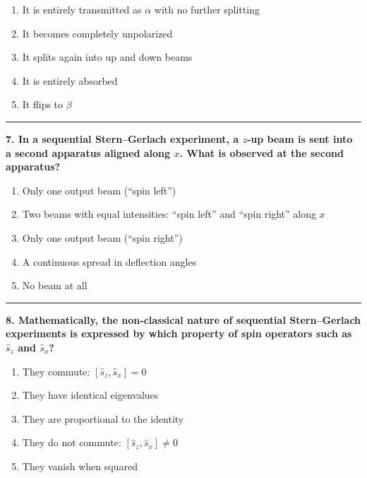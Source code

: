 \documentclass[
  english,
  9pt,
]{extbook}
\providecommand{\tightlist}{%
  \setlength{\itemsep}{0pt}\setlength{\parskip}{0pt}}
\theoremstyle{definition}
\theoremstyle{definition}
\theoremstyle{definition}
\theoremstyle{definition}
\theoremstyle{remark}
\begin{document}
\begin{enumerate}
\def\labelenumi{\alph{enumi}.}
\tightlist
\item
  It is entirely transmitted as \(\alpha\) with no further splitting\\
\item
  It becomes completely unpolarized\\
\item
  It splits again into up and down beams\\
\item
  It is entirely absorbed\\
\item
  It flips to \(\beta\)
\end{enumerate}

\begin{center}\rule{0.5\linewidth}{0.5pt}\end{center}

\textbf{7. In a sequential Stern--Gerlach experiment, a \(z\)-up beam is sent into a second apparatus aligned along \(x\). What is observed at the second apparatus?}

\begin{enumerate}
\def\labelenumi{\alph{enumi}.}
\tightlist
\item
  Only one output beam (``spin left'')\\
\item
  Two beams with equal intensities: ``spin left'' and ``spin right'' along \(x\)\\
\item
  Only one output beam (``spin right'')\\
\item
  A continuous spread in deflection angles\\
\item
  No beam at all
\end{enumerate}

\begin{center}\rule{0.5\linewidth}{0.5pt}\end{center}

\textbf{8. Mathematically, the non‑classical nature of sequential Stern--Gerlach experiments is expressed by which property of spin operators such as \(\hat{s}_z\) and \(\hat{s}_x\)?}

\begin{enumerate}
\def\labelenumi{\alph{enumi}.}
\tightlist
\item
  They commute: \([\hat{s}_z,\hat{s}_x] = 0\)\\
\item
  They have identical eigenvalues\\
\item
  They are proportional to the identity\\
\item
  They do not commute: \([\hat{s}_z,\hat{s}_x] \neq 0\)\\
\item
  They vanish when squared
\end{enumerate}
\end{document}
